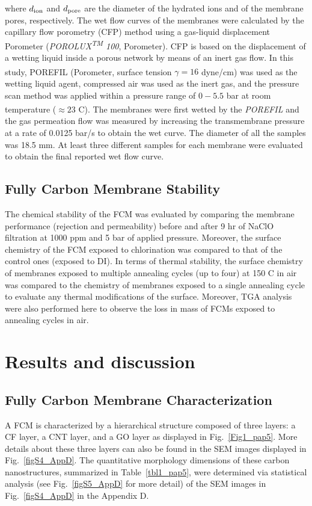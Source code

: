 where $d\textsubscript{ion}$ and $d\textsubscript{pore}$ are the diameter of the hydrated ions and of the membrane pores, respectively.
The wet flow curves of the membranes were calculated by the capillary flow porometry (CFP) method using a gas-liquid displacement Porometer (\textit{POROLUX\textsuperscript{TM} 100}, Porometer). CFP is based on the displacement of a wetting liquid inside a porous network by means of an inert gas flow. In this study, POREFIL\textsuperscript{\tiny\textregistered} (Porometer, surface tension $\gamma = 16$ dyne/cm) was used as the wetting liquid agent, compressed air was used as the inert gas, and the pressure scan method was applied within a pressure range of $0-5.5$ bar at room temperature ($\approx23$ \textdegree C). The membranes were first wetted by the \textit{POREFIL\textsuperscript{\tiny\textregistered}} and the gas permeation flow was measured by increasing the transmembrane pressure at a rate of 0.0125 bar/s to obtain the wet curve. The diameter of all the samples was 18.5 mm. At least three different samples for each membrane were evaluated to obtain the final reported wet flow curve.

\subsection{Fully Carbon Membrane Stability}
The chemical stability of the FCM was evaluated by comparing the membrane performance (rejection and permeability) before and after 9 hr of NaClO filtration at 1000 ppm and 5 bar of applied pressure. Moreover, the surface chemistry of the FCM exposed to chlorination was compared to that of the control ones (exposed to DI). In terms of thermal stability, the surface chemistry of membranes exposed to multiple annealing cycles (up to four) at 150 \textdegree C in air was compared to the chemistry of membranes exposed to a single annealing cycle to evaluate any thermal modifications of the surface. Moreover, TGA analysis were also performed here to observe the loss in mass of FCMs exposed to annealing cycles in air.

\section{Results and discussion}
\subsection{Fully Carbon Membrane Characterization}

A FCM is characterized by a hierarchical structure composed of three layers: a CF layer, a CNT layer, and a GO layer as displayed in Fig.~\ref{Fig1_pap5}. More details about these three layers can also be found in the SEM images displayed in Fig.~\ref{figS4_AppD}. The quantitative morphology dimensions of these carbon nanostructures, summarized in Table~\ref{tbl1_pap5}, were determined via statistical analysis (see Fig.~\ref{figS5_AppD} for more detail) of the SEM images in Fig.~\ref{figS4_AppD} in the Appendix D.


